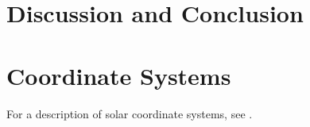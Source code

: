 \documentclass[11pt,a4paper,onecolumn]{report}
\begin{document}
%
%
%
%
%
\chapter{Discussion and Conclusion}
\label{chap:discussion}
%
%
%
%
%

















\appendix

\chapter{Coordinate Systems}
For a description of solar coordinate systems, see
\citet{thompson_w_t_coordinate_2006}.
\end{document}
